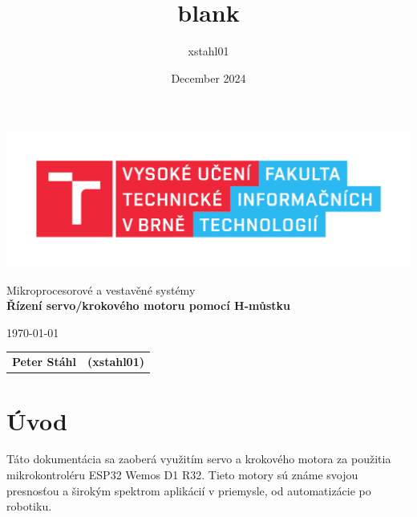 \documentclass[a4paper, 11pt]{article}
\title{blank}
\author{xstahl01 }
\date{December 2024}
\begin{document}
\begin{titlepage}
    \begin{center}
        \includegraphics[width=0.77 \linewidth]{include/FIT_logo.pdf}


        \Huge{Mikroprocesorové a vestavěné systémy} \\
        \LARGE{\textbf{Řízení servo/krokového motoru pomocí H-můstku}} \\
        \Large{}

    \end{center}

    \begin{minipage}{0.5 \textwidth}
        \Large
        \today
    \end{minipage}
    \hfill
    \begin{minipage}[r]{0.5 \textwidth}
        \Large
        \begin{tabular}{ll}
            \textbf{Peter Stáhl} & \textbf{(xstahl01)}
        \end{tabular}
    \end{minipage}
\end{titlepage}


\clearpage
{}
\setcounter{page}{1}
\tableofcontents


\clearpage
{}
\setcounter{page}{1}

\section{Úvod}
Táto dokumentácia sa zaoberá využitím servo a krokového motora za použitia mikrokontroléru ESP32 Wemos D1 R32. Tieto motory sú známe svojou presnosťou a širokým spektrom aplikácií v priemysle, od automatizácie po robotiku. 
\end{document}
